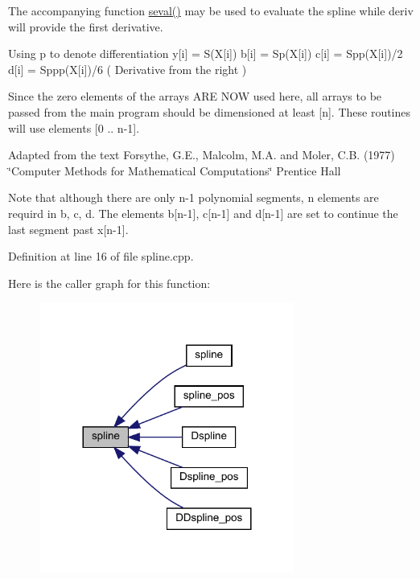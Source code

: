 \begin{DoxyItemize}
\item The accompanying function \mbox{\hyperlink{namespaceamici_a20c8c27889853621fba3e0eacd333723}{seval()}} may be used to evaluate the spline while deriv will provide the first derivative.
\item Using p to denote differentiation y\mbox{[}i\mbox{]} = S(\+X\mbox{[}i\mbox{]}) b\mbox{[}i\mbox{]} = Sp(\+X\mbox{[}i\mbox{]}) c\mbox{[}i\mbox{]} = Spp(\+X\mbox{[}i\mbox{]})/2 d\mbox{[}i\mbox{]} = Sppp(\+X\mbox{[}i\mbox{]})/6 ( Derivative from the right )
\item Since the zero elements of the arrays A\+RE N\+OW used here, all arrays to be passed from the main program should be dimensioned at least \mbox{[}n\mbox{]}. These routines will use elements \mbox{[}0 .. n-\/1\mbox{]}.
\item Adapted from the text Forsythe, G.\+E., Malcolm, M.\+A. and Moler, C.\+B. (1977) \char`\"{}\+Computer Methods for Mathematical Computations\char`\"{} Prentice Hall
\item Note that although there are only n-\/1 polynomial segments, n elements are requird in b, c, d. The elements b\mbox{[}n-\/1\mbox{]}, c\mbox{[}n-\/1\mbox{]} and d\mbox{[}n-\/1\mbox{]} are set to continue the last segment past x\mbox{[}n-\/1\mbox{]}. 
\end{DoxyItemize}

Definition at line 16 of file spline.\+cpp.

Here is the caller graph for this function\+:
\nopagebreak
\begin{figure}[H]
\begin{center}
\leavevmode
\includegraphics[width=236pt]{namespaceamici_aa6801bbdb0c7625719c019ac287be29e_icgraph}
\end{center}
\end{figure}
\mbox{\label{namespaceamici_a20c8c27889853621fba3e0eacd333723}} 
